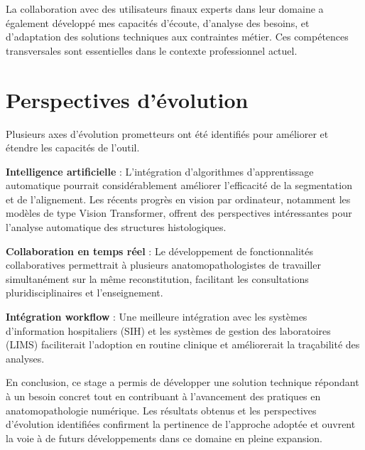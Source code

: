 \documentclass[12pt,a4paper]{report}
\begin{document}
La collaboration avec des utilisateurs finaux experts dans leur domaine a également développé mes capacités d'écoute, d'analyse des besoins, et d'adaptation des solutions techniques aux contraintes métier. Ces compétences transversales sont essentielles dans le contexte professionnel actuel.

\section{Perspectives d'évolution}

Plusieurs axes d'évolution prometteurs ont été identifiés pour améliorer et étendre les capacités de l'outil.

\textbf{Intelligence artificielle} : L'intégration d'algorithmes d'apprentissage automatique pourrait considérablement améliorer l'efficacité de la segmentation et de l'alignement. Les récents progrès en vision par ordinateur, notamment les modèles de type Vision Transformer, offrent des perspectives intéressantes pour l'analyse automatique des structures histologiques.

\textbf{Collaboration en temps réel} : Le développement de fonctionnalités collaboratives permettrait à plusieurs anatomopathologistes de travailler simultanément sur la même reconstitution, facilitant les consultations pluridisciplinaires et l'enseignement.

\textbf{Intégration workflow} : Une meilleure intégration avec les systèmes d'information hospitaliers (SIH) et les systèmes de gestion des laboratoires (LIMS) faciliterait l'adoption en routine clinique et améliorerait la traçabilité des analyses.

En conclusion, ce stage a permis de développer une solution technique répondant à un besoin concret tout en contribuant à l'avancement des pratiques en anatomopathologie numérique. Les résultats obtenus et les perspectives d'évolution identifiées confirment la pertinence de l'approche adoptée et ouvrent la voie à de futurs développements dans ce domaine en pleine expansion.
\end{document}
